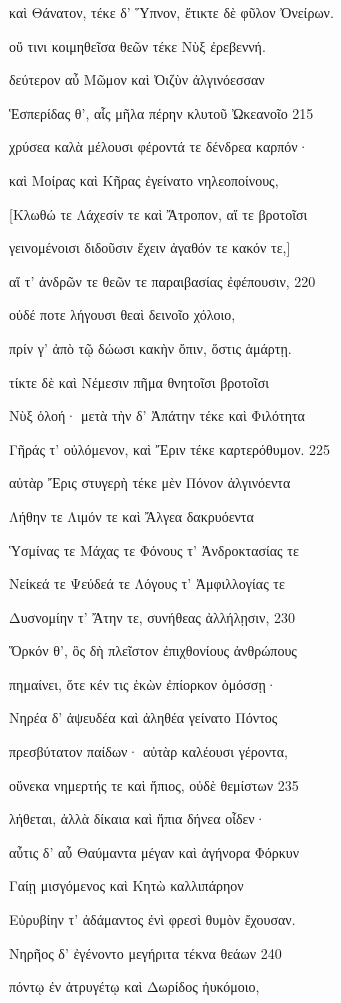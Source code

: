 καὶ Θάνατον, τέκε δ' Ὕπνον, ἔτικτε δὲ φῦλον Ὀνείρων. 

οὔ τινι κοιμηθεῖσα θεῶν τέκε Νὺξ ἐρεβεννή. 

δεύτερον αὖ Μῶμον καὶ Ὀιζὺν ἀλγινόεσσαν

Ἑσπερίδας θ', αἷς μῆλα πέρην κλυτοῦ Ὠκεανοῖο \num{215} 

χρύσεα καλὰ μέλουσι φέροντά τε δένδρεα καρπόν·

καὶ Μοίρας καὶ Κῆρας ἐγείνατο νηλεοποίνους,

{[}Κλωθώ τε Λάχεσίν τε καὶ Ἄτροπον, αἵ τε βροτοῖσι 

γεινομένοισι διδοῦσιν ἔχειν ἀγαθόν τε κακόν τε,{]} 

αἵ τ' ἀνδρῶν τε θεῶν τε παραιβασίας ἐφέπουσιν, \num{220} 

οὐδέ ποτε λήγουσι θεαὶ δεινοῖο χόλοιο,

πρίν γ' ἀπὸ τῷ δώωσι κακὴν ὄπιν, ὅστις ἁμάρτῃ.

τίκτε δὲ καὶ Νέμεσιν πῆμα θνητοῖσι βροτοῖσι 

Νὺξ ὀλοή· μετὰ τὴν δ' Ἀπάτην τέκε καὶ Φιλότητα 

Γῆράς τ' οὐλόμενον, καὶ Ἔριν τέκε καρτερόθυμον. \num{225}

αὐτὰρ Ἔρις στυγερὴ τέκε μὲν Πόνον ἀλγινόεντα

Λήθην τε Λιμόν τε καὶ Ἄλγεα δακρυόεντα

Ὑσμίνας τε Μάχας τε Φόνους τ' Ἀνδροκτασίας τε

Νείκεά τε Ψεύδεά τε Λόγους τ' Ἀμφιλλογίας τε 

Δυσνομίην τ' Ἄτην τε, συνήθεας ἀλλήλῃσιν, \num{230}

Ὅρκόν θ', ὃς δὴ πλεῖστον ἐπιχθονίους ἀνθρώπους

πημαίνει, ὅτε κέν τις ἑκὼν ἐπίορκον ὀμόσσῃ· 

Νηρέα δ' ἀψευδέα καὶ ἀληθέα γείνατο Πόντος 

πρεσβύτατον παίδων· αὐτὰρ καλέουσι γέροντα, 

οὕνεκα νημερτής τε καὶ ἤπιος, οὐδὲ θεμίστων \num{235}

λήθεται, ἀλλὰ δίκαια καὶ ἤπια δήνεα οἶδεν· 

αὖτις δ' αὖ Θαύμαντα μέγαν καὶ ἀγήνορα Φόρκυν

Γαίῃ μισγόμενος καὶ Κητὼ καλλιπάρηον 

Εὐρυβίην τ' ἀδάμαντος ἐνὶ φρεσὶ θυμὸν ἔχουσαν.

Νηρῆος δ' ἐγένοντο μεγήριτα τέκνα θεάων \num{240}

πόντῳ ἐν ἀτρυγέτῳ καὶ Δωρίδος ἠυκόμοιο,


